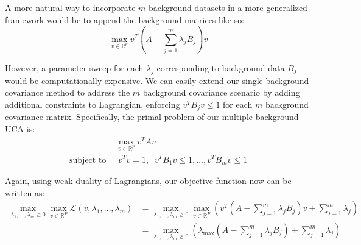 \documentclass[12pt]{article}
\begin{document}
A more natural way to incorporate $m$ background datasets in a more generalized framework would be to append the background matrices like so:
\[\max_{v\in \mathbb{R}^p}{v^T\left(A - \sum^{m}_{j=1}{\lambda_jB_j}\right)v}\]

However, a parameter sweep for each $\lambda_j$ corresponding to background data $B_j$ would be computationally expensive.
We can easily extend our single background covariance method to address the $m$ background covariance scenario by adding additional constraints to Lagrangian, enforcing $ v^TB_jv\leq 1$ for each $m$ background covariance matrix. Specifically, the primal problem of our multiple background UCA is:
\begin{align}
  &\max_{v\in \mathbb{R}^p}{v^TAv} \label{eq:4}\\ 
  \text{subject to }&\; v^{T}v=1,\;\; v^TB_1 v \leq 1, \ldots, v^T B_m v\leq 1 \nonumber
\end{align}

Again, using weak duality of Lagrangians, our objective function now can be written as:
\begin{align}
  \max_{\lambda_1,\ldots,\lambda_m \geq 0}{\max_{v\in \mathbb{R}^{P}}{\mathcal{L}\left(v, \lambda_1, \ldots, \lambda_m\right)}}%
                                                                                                                                &=\max_{\lambda_1,\ldots,\lambda_m \geq 0}{\max_{v\in \mathbb{R}^{P}}{\left(v^T\left(A - \sum^{m}_{j = 1}{\lambda_j B_j}\right)v + \sum^{m}_{j=1}{\lambda_j}\right)}} \nonumber\\
                                                                                                                                &=\max_{\lambda_1,\ldots,\lambda_m \geq 0}{\left(\lambda_{\text{max}}\left(A - \sum^{m}_{j = 1}{\lambda_j B_j}\right) + \sum^{m}_{j=1}{\lambda_j}\right)} \label{eq:5}
\end{align}
\end{document}
